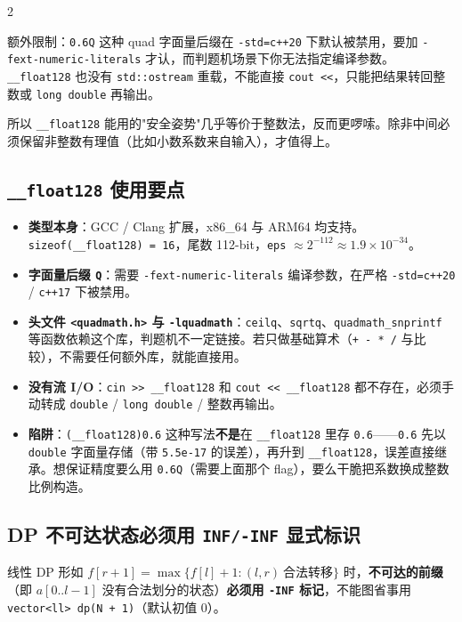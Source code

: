 \begin{multicols*}{2}
\begin{enumerate}
			额外限制：\texttt{0.6Q} 这种 quad 字面量后缀在 \texttt{-std=c++20} 下默认被禁用，要加 \texttt{-fext-numeric-literals} 才认，而判题机场景下你无法指定编译参数。\texttt{\_\_float128} 也没有 \texttt{std::ostream} 重载，不能直接 \texttt{cout <<}，只能把结果转回整数或 \texttt{long double} 再输出。

			所以 \texttt{\_\_float128} 能用的"安全姿势"几乎等价于整数法，反而更啰嗦。除非中间必须保留非整数有理值（比如小数系数来自输入），才值得上。
		\end{enumerate}

		\subsection{\texttt{\_\_float128} 使用要点}

		\begin{itemize}
			\item \textbf{类型本身}：GCC / Clang 扩展，x86\_64 与 ARM64 均支持。\texttt{sizeof(\_\_float128) = 16}，尾数 112-bit，\texttt{eps} $\approx 2^{-112} \approx 1.9 \times 10^{-34}$。
			\item \textbf{字面量后缀 \texttt{Q}}：需要 \texttt{-fext-numeric-literals} 编译参数，在严格 \texttt{-std=c++20} / \texttt{c++17} 下被禁用。
			\item \textbf{头文件 \texttt{<quadmath.h>} 与 \texttt{-lquadmath}}：\texttt{ceilq}、\texttt{sqrtq}、\texttt{quadmath\_snprintf} 等函数依赖这个库，判题机不一定链接。若只做基础算术（\texttt{+ - * /} 与比较），不需要任何额外库，就能直接用。
			\item \textbf{没有流 I/O}：\texttt{cin >> \_\_float128} 和 \texttt{cout << \_\_float128} 都不存在，必须手动转成 \texttt{double} / \texttt{long double} / 整数再输出。
			\item \textbf{陷阱}：\texttt{(\_\_float128)0.6} 这种写法\textbf{不是}在 \texttt{\_\_float128} 里存 \texttt{0.6}——\texttt{0.6} 先以 \texttt{double} 字面量存储（带 \texttt{5.5e-17} 的误差），再升到 \texttt{\_\_float128}，误差直接继承。想保证精度要么用 \texttt{0.6Q}（需要上面那个 flag），要么干脆把系数换成整数比例构造。
		\end{itemize}

		\subsection{DP 不可达状态必须用 \texttt{INF/-INF} 显式标识}

		线性 DP 形如 $f[r{+}1] = \max\{f[l] + 1 : (l, r)\ \text{合法转移}\}$ 时，\textbf{不可达的前缀}（即 $a[0..l{-}1]$ 没有合法划分的状态）\textbf{必须用 \texttt{-INF} 标记}，不能图省事用 \texttt{vector<ll> dp(N + 1)}（默认初值 0）。


\end{multicols*}
